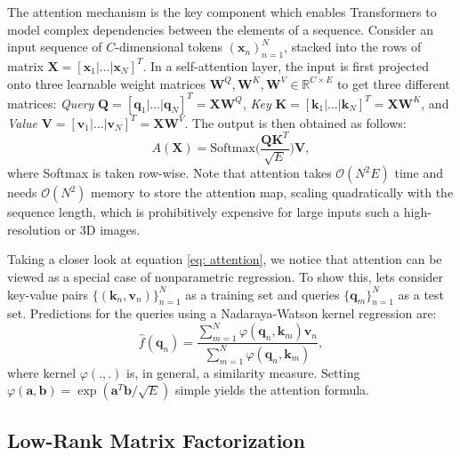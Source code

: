 \documentclass[a4,12pt]{article}
\begin{document}
	The attention mechanism is the key component which enables Transformers to model complex dependencies between the elements of a sequence. Consider an input sequence of $C$-dimensional tokens $ (\mathbf{x}_n)_{n=1}^{N} $, stacked into the rows of matrix $ \mathbf{X} = [\mathbf{x}_1|\dots|\mathbf{x}_N]^T $. In a self-attention layer, the input is first projected onto three learnable weight matrices $ \mathbf{W}^Q, \mathbf{W}^K, \bm{W}^V \in \mathbb{R}^{C \times E} $ to get three different matrices: \textit{Query} $ \mathbf{Q} = [\mathbf{q}_1|\dots|\mathbf{q}_N]^T = \mathbf{X} \mathbf{W}^Q $, \textit{Key}  $ \mathbf{K} = [\mathbf{k}_1|\dots|\mathbf{k}_N]^T = \mathbf{X} \mathbf{W}^K $, and \textit{Value} $ \mathbf{V} = [\mathbf{v}_1|\dots|\mathbf{v}_N]^T = \mathbf{X} \bm{W}^V $. The output is then obtained as follows:
	\begin{equation}
		\label{eq: attention}
		A(\bm{X}) = \text{Softmax}\bigg( \frac{\bm{Q} \bm{K}^{T} }{\sqrt{E}} \bigg) \bm{V},
	\end{equation}
	where Softmax is taken row-wise. Note that attention takes $ \mathcal{O}(N^2 E) $ time and needs $ \mathcal{O}(N^2) $ memory to store the attention map, scaling quadratically with the sequence length, which is prohibitively expensive for large inputs such a high-resolution or 3D images. 
	
	Taking a closer look at equation \eqref{eq: attention}, we notice that attention can be viewed as a special case of nonparametric regression. To show this, lets consider key-value pairs $ \{ (\mathbf{k}_n, \mathbf{v}_n) \}_{n=1}^{N} $ as a training set and queries $ \{ \mathbf{q}_m \}_{n=1}^{N} $ as a test set. Predictions for the queries using a Nadaraya-Watson kernel regression \citep{hardle2004nonparametric} are:
	\begin{equation}
		\label{eq: kernel regression}
		\hat{f}(\mathbf{q}_n) = \frac{\sum_{m=1}^{N} \varphi(\mathbf{q}_n, \mathbf{k}_m) \mathbf{v}_n}{\sum_{m=1}^{N} \varphi(\mathbf{q}_n, \mathbf{k}_m)},
	\end{equation}
	where kernel $ \varphi(.,.) $ is, in general, a similarity measure. Setting $ \varphi(\mathbf{a}, \mathbf{b}) = \exp(\mathbf{a}^T \mathbf{b}/\sqrt{E}) $ simple yields the attention formula. 
	
	
	\subsection{Low-Rank Matrix Factorization} \label{sec: lowrank matrix factorization}
	
\end{document}
